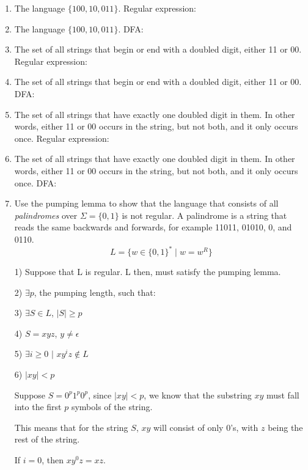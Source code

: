 \documentclass{article}
\begin{document}
\begin{enumerate}
\item
  \label{langfirst}
  The language $\{100, 10, 011\}$.
  Regular expression: 
  
  

\item   The language $\{100, 10, 011\}$.
  DFA:
  

\item The set of 
  all strings that begin or end with a doubled digit, either 11 or 00.
  Regular expression:

  
\item The set of 
  all strings that begin or end with a doubled digit, either 11 or 00.
  DFA:
  
  
\item
The set of all strings that have exactly one doubled digit in them.
  In other words, either 11 or 00 occurs in the string, but not both,
  and it only occurs once.
  Regular expression:
  

\item \label{langlast}
The set of all strings that have exactly one doubled digit in them.
  In other words, either 11 or 00 occurs in the string, but not both,
  and it only occurs once.
DFA:

\item Use the pumping lemma to show that the language that consists of
  all {\em palindromes} over $\Sigma=\{0,1\}$ is not regular.  A palindrome
  is a string that reads the same backwards and forwards, for example
  11011, 01010, 0, and 0110.
  \[ L = \{w \in \{0,1\}^* \mid w = w^R\}\]
  
  1) Suppose that L is regular. L then, must satisfy the pumping lemma.
  
  2) $\exists p$, the pumping length, such that:
  
  3) $\exists S \in L$, $|S| \geq p$
  
  4) $S = xyz$, $y \neq \epsilon$
  
  5) $\exists i \geq 0$ $|$ $xy^iz \notin L$
  
  6) $|xy| < p$
  
  Suppose $S = 0^p1^p0^p$, since $|xy| < p$, we know that the substring $xy$ must fall into the first $p$
  symbols of the string. 
  
  This means that for the string $S$, $xy$ will consist of only 0's, with $z$ being the rest of the string.
  
  If $i = 0$, then $xy^0z = xz$. 
  

\end{enumerate}
\end{document}
